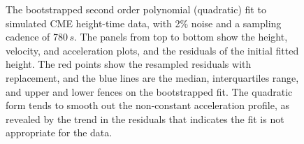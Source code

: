 \documentclass[structabstract]{aa}
\begin{document}
\begin{figure}[t]
\caption{The bootstrapped second order polynomial (quadratic) fit to simulated CME height-time data, with 2\% noise and a sampling cadence of 780$\,s$. The panels from top to bottom show the height, velocity, and acceleration plots, and the residuals of the initial fitted height. The red points show the resampled residuals with replacement, and the blue lines are the median, interquartiles range, and upper and lower fences on the bootstrapped fit. The quadratic form tends to smooth out the non-constant acceleration profile, as revealed by the trend in the residuals that indicates the fit is not appropriate for the data.}
\label{fig_quadratic}
\end{figure}


\end{document}
